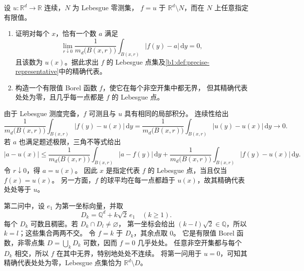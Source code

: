 \begin{exercise}\label{b1:ex:14-representative-null-change}
设 \(u\colon\mathbb R^d\to\mathbb R\) 连续，\(N\) 为 Lebesgue 零测集，
\(f=u\) 于 \(\mathbb R^d\setminus N\)，而在 \(N\) 上任意指定有限值。
\begin{enumerate}
\item\label{b1:item:14-representative-unique-value}
证明对每个 \(x\)，恰有一个数 \(a\) 满足
\[
 \lim_{r\downarrow0}\frac1{m_d\bigl(B(x,r)\bigr)}
       \int_{B(x,r)}|f(y)-a|\,\mathrm dy=0,
\]
且该数为 \(u(x)\)。据此求出 \(f\) 的 Lebesgue 点集及\cref{b1:def:precise-representative}中的精确代表。
\item\label{b1:item:14-representative-unbounded}
构造一个有限值 Borel 函数 \(f\)，使它在每个非空开集中都无界，
但其精确代表处处为零，且几乎每一点都是 \(f\) 的 Lebesgue 点。
\end{enumerate}
\end{exercise}
\begin{solution}
由于 Lebesgue 测度完备，\(f\) 可测且与 \(u\) 具有相同的局部积分。
连续性给出
\[
 \frac1{m_d\bigl(B(x,r)\bigr)}\int_{B(x,r)}|f(y)-u(x)|\,\mathrm dy
 =\frac1{m_d\bigl(B(x,r)\bigr)}\int_{B(x,r)}|u(y)-u(x)|\,\mathrm dy
 \longrightarrow0.
\]
若 \(a\) 也满足题述极限，三角不等式给出
\[
 |a-u(x)|
 \leq\frac1{m_d\bigl(B(x,r)\bigr)}\int_{B(x,r)}|a-f(y)|\,\mathrm dy
 +\frac1{m_d\bigl(B(x,r)\bigr)}\int_{B(x,r)}|f(y)-u(x)|\,\mathrm dy.
\]
令 \(r\downarrow0\)，得 \(a=u(x)\)。
因此 \(x\) 是指定代表 \(f\) 的 Lebesgue 点，当且仅当 \(f(x)=u(x)\)。
另一方面，\(f\) 的球平均在每一点都趋于 \(u(x)\)，故其精确代表处处等于 \(u\)。

第二问中，设 \(e_1\) 为第一坐标向量，并取
\[
 D_k=\mathbb Q^d+k\sqrt2\,e_1\quad(k\geq1).
\]
每个 \(D_k\) 可数且稠密。若 \(D_k\cap D_l\ne\varnothing\)，
第一坐标会给出 \((k-l)\sqrt2\in\mathbb Q\)，所以 \(k=l\)；这些集合两两不交。
令 \(f=k\) 于 \(D_k\)，其余点取 \(0\)。
它是有限值 Borel 函数，非零点集 \(D=\bigcup_kD_k\) 可数，因而 \(f=0\) 几乎处处。
任意非空开集都与每个 \(D_k\) 相交，所以 \(f\) 在其中无界，特别地处处不连续。
将第一问用于 \(u=0\)，可知其精确代表处处为零，Lebesgue 点集恰为 \(\mathbb R^d\setminus D\)。
\end{solution}

